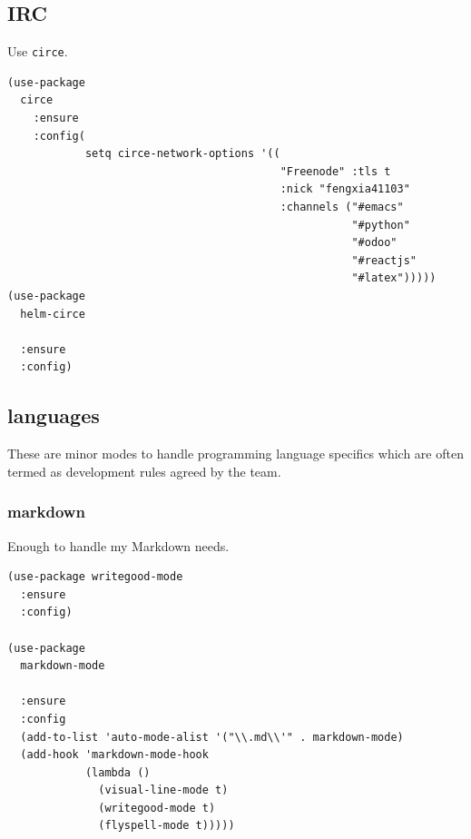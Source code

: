 \documentclass[11pt]{article}
\begin{document}
\subsection{IRC}
\label{sec:org72a3a13}
Use \texttt{circe}.
\begin{verbatim}
(use-package
  circe
    :ensure
    :config(
            setq circe-network-options '((
                                          "Freenode" :tls t
                                          :nick "fengxia41103"
                                          :channels ("#emacs"
                                                     "#python"
                                                     "#odoo"
                                                     "#reactjs"
                                                     "#latex")))))
(use-package
  helm-circe

  :ensure
  :config)
\end{verbatim}

\subsection{languages}
\label{sec:org78f58dc}

These are minor modes to handle programming language specifics which
are often termed as development rules agreed by the team.
\subsubsection{markdown}
\label{sec:org6ac447b}
Enough to handle my Markdown needs.

\begin{verbatim}
(use-package writegood-mode
  :ensure
  :config)

(use-package
  markdown-mode

  :ensure
  :config
  (add-to-list 'auto-mode-alist '("\\.md\\'" . markdown-mode)
  (add-hook 'markdown-mode-hook
            (lambda ()
              (visual-line-mode t)
              (writegood-mode t)
              (flyspell-mode t)))))
\end{verbatim}
\end{document}
